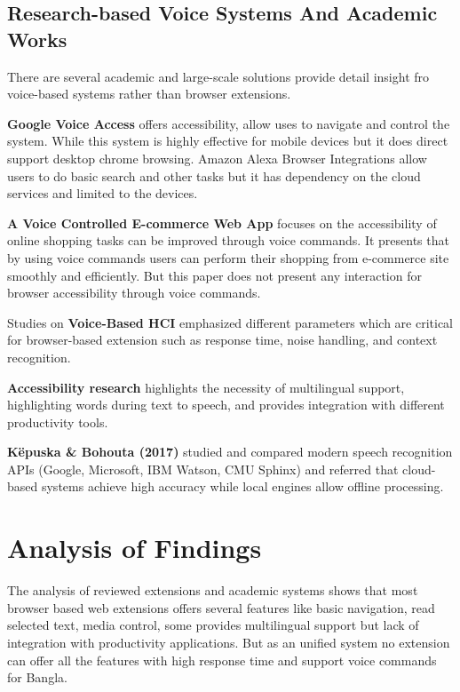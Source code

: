 	\subsection{Research-based Voice Systems And Academic Works}
	There are several academic and large-scale solutions provide detail insight fro voice-based systems rather than browser extensions.
	
	\textbf{Google Voice Access\cite{googlevoice}} offers accessibility, allow uses to navigate and control the system. While this system is highly effective for mobile devices but it does direct support desktop chrome browsing. Amazon Alexa Browser Integrations\cite{amazonvoice} allow users to do basic search and other tasks but it has dependency on the cloud services and limited to the devices.
	
	\textbf{A Voice Controlled E-commerce Web App\cite{voicecommerce}} focuses on the accessibility of online shopping tasks can be improved through voice commands. It presents that by using voice commands users can perform their shopping from e-commerce site smoothly and efficiently. But this paper does not present any interaction for browser accessibility through voice commands.
	
	Studies on \textbf{Voice-Based HCI\cite{researchstudies}} emphasized different parameters  which are critical for browser-based extension such as  response time, noise handling, and context recognition.
	
	\textbf{Accessibility research\cite{accessibilitystudies}} highlights the necessity of multilingual support, highlighting words during text to speech, and provides integration with different productivity tools.
	
	\textbf{Këpuska \& Bohouta (2017)\cite{kepuska2017comparing}} studied and compared  modern speech recognition APIs (Google, Microsoft, IBM Watson, CMU Sphinx) and referred that cloud-based systems achieve high accuracy while local engines allow offline processing.
	
	\section{Analysis of Findings}
	The analysis of reviewed extensions and academic systems shows that most browser based web extensions offers several features like basic navigation, read selected text, media control, some provides multilingual support but lack of integration with productivity applications. But as an unified system no extension can offer all the features with high response time and support voice commands for Bangla. 
	
